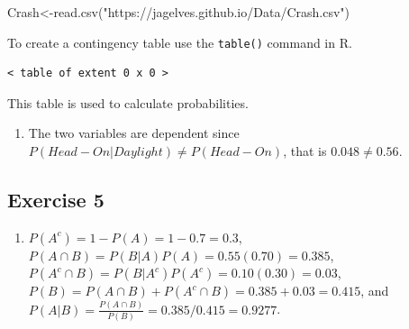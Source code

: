 \documentclass[
  letterpaper,
  DIV=11,
  numbers=noendperiod]{scrreprt}
\newenvironment{Shaded}{\begin{snugshade}}{\end{snugshade}}
\newcommand{\AttributeTok}[1]{\textcolor[rgb]{0.40,0.45,0.13}{#1}}
\newcommand{\FunctionTok}[1]{\textcolor[rgb]{0.28,0.35,0.67}{#1}}
\newcommand{\NormalTok}[1]{\textcolor[rgb]{0.00,0.23,0.31}{#1}}
\newcommand{\OtherTok}[1]{\textcolor[rgb]{0.00,0.23,0.31}{#1}}
\newcommand{\SpecialCharTok}[1]{\textcolor[rgb]{0.37,0.37,0.37}{#1}}
\newcommand{\StringTok}[1]{\textcolor[rgb]{0.13,0.47,0.30}{#1}}
\providecommand{\tightlist}{%
  \setlength{\itemsep}{0pt}\setlength{\parskip}{0pt}}\usepackage{longtable,booktabs,array}
\begin{document}
\begin{Shaded}
\begin{Highlighting}[numbers=left,,]
\NormalTok{Crash}\OtherTok{\textless{}{-}}\FunctionTok{read.csv}\NormalTok{(}\StringTok{"https://jagelves.github.io/Data/Crash.csv"}\NormalTok{)}
\end{Highlighting}
\end{Shaded}

To create a contingency table use the \texttt{table()} command in R.

\begin{Shaded}
\end{Shaded}

\begin{verbatim}
< table of extent 0 x 0 >
\end{verbatim}

This table is used to calculate probabilities.

\begin{blackbox}

\begin{enumerate}
\def\labelenumi{\arabic{enumi}.}
\setcounter{enumi}{1}
\tightlist
\item
  The two variables are dependent since
  \(P(Head-On|Daylight) \neq P(Head-On)\), that is \(0.048 \neq 0.56\).
\end{enumerate}

\end{blackbox}

\hypertarget{exercise-5-1}{%
\subsection*{Exercise 5}\label{exercise-5-1}}

\begin{blackbox}

\begin{enumerate}
\def\labelenumi{\arabic{enumi}.}
\tightlist
\item
  \(P(A^c)=1-P(A)=1-0.7=0.3\),
  \(P(A \cap B)=𝑃(𝐵|𝐴)𝑃(𝐴) = 0.55(0.70) = 0.385\),
  \(P(A^c \cap B)=𝑃(B|A^c)𝑃(A^c) = 0.10(0.30) = 0.03\),
  \(P(B)= 𝑃(A \cap B) + 𝑃(𝐴^c \cap 𝐵) = 0.385 + 0.03 = 0.415\), and
  \(P(A|B)= \frac{𝑃(A \cap B)}{P(B)}=0.385/0.415=0.9277\).
\end{enumerate}

\end{blackbox}
\end{document}
